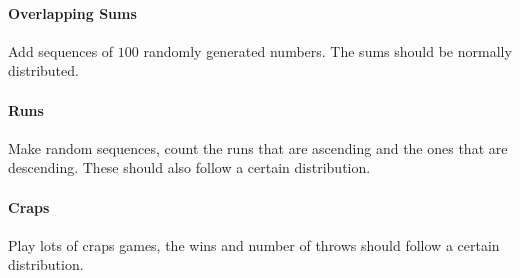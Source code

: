 \documentclass[11pt]{article}
\begin{document}
\paragraph{Overlapping Sums}
Add sequences of $100$ randomly generated numbers. The sums should be normally distributed.
\paragraph{Runs}
Make random sequences, count the runs that are ascending and the ones that are descending. These should also follow a certain distribution.
\paragraph{Craps}
Play lots of craps games, the wins and number of throws should follow a certain distribution. 
\end{document}
